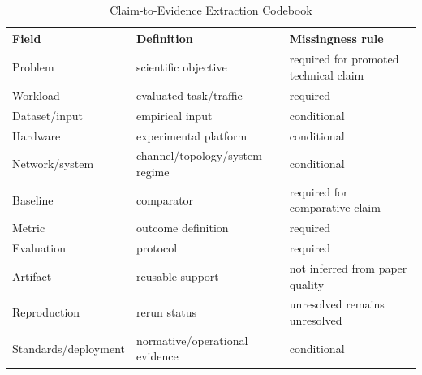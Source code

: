 \begin{table}[H]\centering\caption{Claim-to-Evidence Extraction Codebook}\label{tab:codebook}\scriptsize\begin{tabularx}{\columnwidth}{p{}p{}Y}\toprule Field & Definition & Missingness rule\\\midrule Problem & scientific objective & required for promoted technical claim\\ Workload & evaluated task/traffic & required\\ Dataset/input & empirical input & conditional\\ Hardware & experimental platform & conditional\\ Network/system & channel/topology/system regime & conditional\\ Baseline & comparator & required for comparative claim\\ Metric & outcome definition & required\\ Evaluation & protocol & required\\ Artifact & reusable support & not inferred from paper quality\\ Reproduction & rerun status & unresolved remains unresolved\\ Standards/deployment & normative/operational evidence & conditional\\\bottomrule\end{tabularx}\end{table}